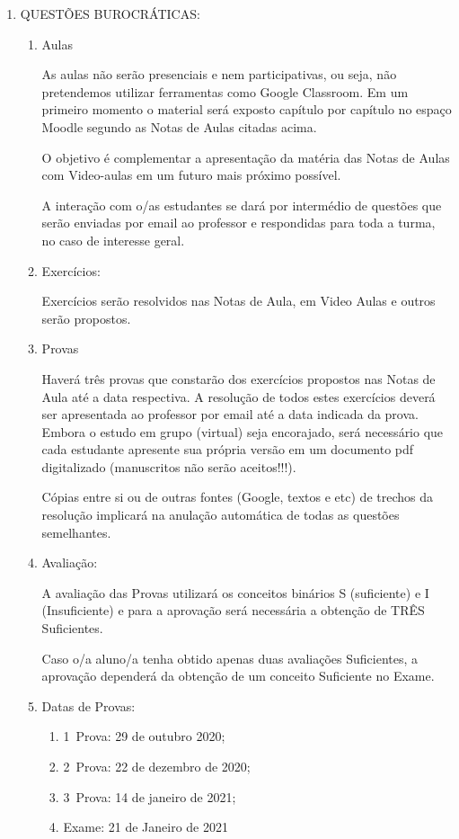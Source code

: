 \begin{enumerate}
\item QUESTÕES BUROCRÁTICAS:

\begin{enumerate}
\item Aulas

As aulas não serão presenciais e nem participativas, ou seja, não pretendemos utilizar ferramentas como Google Classroom. Em um primeiro momento o material será exposto capítulo por capítulo no espaço Moodle segundo as Notas de Aulas citadas acima.
    
O objetivo é complementar a apresentação da matéria das Notas de Aulas com Video-aulas em um futuro mais próximo possível.

A interação com o/as estudantes se dará por intermédio de questões que serão enviadas por email ao professor e respondidas para toda a turma, no caso de interesse geral.

\item Exercícios:

Exercícios serão resolvidos nas Notas de Aula, em Video Aulas e outros serão propostos.

\item Provas

Haverá três provas que constarão dos exercícios propostos nas Notas de Aula até a data respectiva. A resolução de todos estes exercícios deverá ser apresentada ao professor por email até a data indicada da prova. Embora o estudo em grupo (virtual) seja encorajado, será necessário que cada estudante apresente sua própria versão em um documento pdf digitalizado (manuscritos não serão aceitos!!!).

Cópias entre si ou de outras fontes (Google, textos e etc) de trechos da resolução implicará na anulação automática de todas as questões semelhantes.

\item Avaliação:

A avaliação das Provas utilizará os conceitos binários S (suficiente) e I (Insuficiente) e para a aprovação será necessária a obtenção de TRÊS Suficientes.

Caso o/a aluno/a tenha obtido apenas duas avaliações Suficientes, a aprovação dependerá da obtenção de um conceito Suficiente no Exame.

\item Datas de Provas:
\begin{enumerate}
\item 1\textordfeminine\ Prova: 29 de outubro 2020;
\item 2\textordfeminine\ Prova: 22 de dezembro de 2020;
\item 3\textordfeminine\ Prova: 14 de janeiro de 2021;
\item Exame: 21 de Janeiro de 2021
\end{enumerate}
\end{enumerate}

\end{enumerate}

